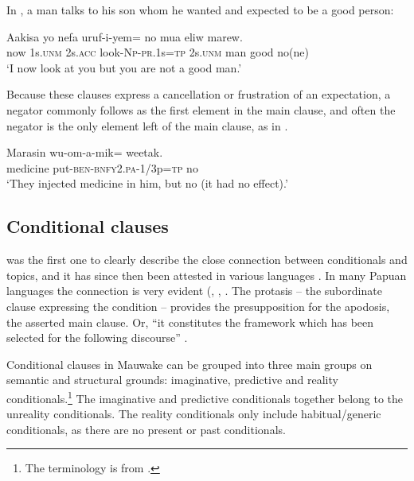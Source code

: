 In , a man talks to his son whom he wanted and expected to be a good person:

\ea%
\label{ex:8:x1397}
\gll Aakisa  yo  nefa  uruf-i-yem= no  mua eliw marew.\\
now  1s.\textsc{unm} 2s.\textsc{acc} look-\textsc{Np}-\textsc{pr}.1s=\textsc{tp} 2s.\textsc{unm} man good no(ne)\\
\glt`I now look at you but you are not a good man.'
\z


Because these clauses express a cancellation or frustration of an expectation, a negator commonly follows as the first element in the main clause, and often the negator is the only element left of the main clause, as in .

\ea%
\label{ex:8:x1398}
\gll Marasin  wu-om-a-mik=  weetak.\\
medicine put-\textsc{ben}-\textsc{bnfy}2.\textsc{pa}-1/3p=\textsc{tp} no\\
\glt`They injected medicine in him, but no (it had no effect).'
\z


\subsection{Conditional clauses}  \label{sec:8.3.5}

\citet{Haiman1978} was the first one to clearly describe the close connection between conditionals and topics, and it has since then been attested in various languages \citep[292]{ThompsonEtAl2007}. In many Papuan languages the connection is very evident (\citealt[235--244]{Reesink1987}, \citealt[304--308]{MacDonald1990}, \citealt[263]{Farr1999}. The protasis -- the subordinate clause expressing the condition -- provides the presupposition for the apodosis, the asserted main clause. Or, ``it constitutes the framework which has been selected for the following discourse'' \citep[585]{Haiman1978}.

Conditional clauses in Mauwake can be grouped into three main groups on semantic and structural grounds: imaginative, predictive and reality conditionals.\footnote{The terminology is from \citet[255]{ThompsonEtAl2007}.} The imaginative and predictive conditionals together belong to the unreality conditionals. The reality conditionals only include habitual/generic conditionals, as there are no present or past conditionals.

